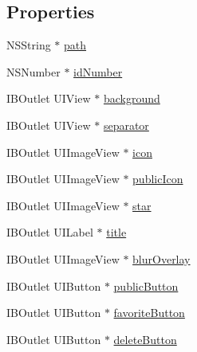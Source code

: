 \subsection*{Properties}
\begin{DoxyCompactItemize}
\item 
N\-S\-String $\ast$ \hyperlink{interface_w_file_cell_a15b4aea27367ab8f92836757ce308012}{path}
\item 
N\-S\-Number $\ast$ \hyperlink{interface_w_file_cell_ab32cbabc30e2d1f789a4d7e447bbf6ae}{id\-Number}
\item 
I\-B\-Outlet U\-I\-View $\ast$ \hyperlink{interface_w_file_cell_af0550bfeff7310c644d3c990c59da9c9}{background}
\item 
I\-B\-Outlet U\-I\-View $\ast$ \hyperlink{interface_w_file_cell_a759d916b6fd09549a2d37f450b1c4b84}{separator}
\item 
I\-B\-Outlet U\-I\-Image\-View $\ast$ \hyperlink{interface_w_file_cell_ae573d05e295607950ee5df03a11c698b}{icon}
\item 
I\-B\-Outlet U\-I\-Image\-View $\ast$ \hyperlink{interface_w_file_cell_a5eba926c28248e45dd3f0ed980bf05d1}{public\-Icon}
\item 
I\-B\-Outlet U\-I\-Image\-View $\ast$ \hyperlink{interface_w_file_cell_a855adca65a5fcae0cf4d42ca2705a5e9}{star}
\item 
I\-B\-Outlet U\-I\-Label $\ast$ \hyperlink{interface_w_file_cell_ae4e0948d36065919739b6d6d7943456f}{title}
\item 
I\-B\-Outlet U\-I\-Image\-View $\ast$ \hyperlink{interface_w_file_cell_aaf50a6654dff338dbb42451f3e10d100}{blur\-Overlay}
\item 
I\-B\-Outlet U\-I\-Button $\ast$ \hyperlink{interface_w_file_cell_a681554e957388c602d06ce9f231960c8}{public\-Button}
\item 
I\-B\-Outlet U\-I\-Button $\ast$ \hyperlink{interface_w_file_cell_a8cbcbeb6a24ca5839efc486d1bf18fc2}{favorite\-Button}
\item 
I\-B\-Outlet U\-I\-Button $\ast$ \hyperlink{interface_w_file_cell_a365aa2834a8db7287db35b506e9fd763}{delete\-Button}
\end{DoxyCompactItemize}



